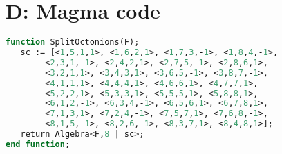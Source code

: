 

\chapter{D: Magma code}
\label{AppD}

\begin{lstlisting}[language=Pascal]
function SplitOctonions(F);
   sc := [<1,5,1,1>, <1,6,2,1>, <1,7,3,-1>, <1,8,4,-1>, 
   		<2,3,1,-1>, <2,4,2,1>, <2,7,5,-1>, <2,8,6,1>,
   		<3,2,1,1>, <3,4,3,1>, <3,6,5,-1>, <3,8,7,-1>, 
   		<4,1,1,1>, <4,4,4,1>, <4,6,6,1>, <4,7,7,1>,
   		<5,2,2,1>, <5,3,3,1>, <5,5,5,1>, <5,8,8,1>,
   		<6,1,2,-1>, <6,3,4,-1>, <6,5,6,1>, <6,7,8,1>,
   		<7,1,3,1>, <7,2,4,-1>, <7,5,7,1>, <7,6,8,-1>,
   		<8,1,5,-1>, <8,2,6,-1>, <8,3,7,1>, <8,4,8,1>];
   return Algebra<F,8 | sc>;
end function;
\end{lstlisting}


